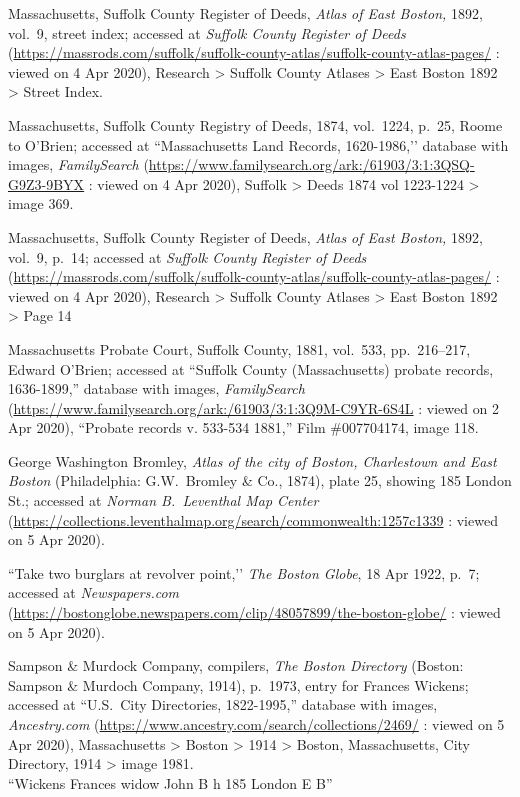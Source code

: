 \begin{thebibliography}{999}
Massachusetts, Suffolk County Register of Deeds, \textit{Atlas of East Boston,} 1892, vol.\ 9, street index; accessed at \textit{Suffolk County Register of Deeds} (\url{https://massrods.com/suffolk/suffolk-county-atlas/suffolk-county-atlas-pages/} : viewed on 4 Apr 2020), Research > Suffolk County Atlases > East Boston 1892 > Street Index.

Massachusetts, Suffolk County Registry of Deeds, 1874, vol.\ 1224, p.\ 25, Roome to O’Brien; accessed at ``Massachusetts Land Records, 1620-1986,’’ database with images, \textit{FamilySearch} (\url{https://www.familysearch.org/ark:/61903/3:1:3QSQ-G9Z3-9BYX} : viewed on 4 Apr 2020), Suffolk > Deeds 1874 vol 1223-1224 > image 369.

Massachusetts, Suffolk County Register of Deeds, \textit{Atlas of East Boston,} 1892, vol.\ 9, p.\ 14; accessed at \textit{Suffolk County Register of Deeds} (\url{https://massrods.com/suffolk/suffolk-county-atlas/suffolk-county-atlas-pages/} : viewed on 4 Apr 2020), Research > Suffolk County Atlases > East Boston 1892 > Page 14

Massachusetts Probate Court, Suffolk County, 1881, vol.\ 533, pp.\ 216--217, Edward O'Brien; accessed at ``Suffolk County (Massachusetts) probate records, 1636-1899,'' database with images, \textit{FamilySearch} (\url{https://www.familysearch.org/ark:/61903/3:1:3Q9M-C9YR-6S4L} : viewed on 2 Apr 2020), ``Probate records v. 533-534 1881,'' Film \#007704174, image 118.

George Washington Bromley, \textit{Atlas of the city of Boston, Charlestown and East Boston} (Philadelphia: G.W.\ Bromley \& Co., 1874), plate 25, showing 185 London St.; accessed at \textit{Norman B.\ Leventhal Map Center} (\url{https://collections.leventhalmap.org/search/commonwealth:1257c1339} : viewed on 5 Apr 2020).

``Take two burglars at revolver point,’’ \textit{The Boston Globe}, 18 Apr 1922, p.\ 7; accessed at \textit{Newspapers.com} (\url{https://bostonglobe.newspapers.com/clip/48057899/the-boston-globe/} : viewed on 5 Apr 2020).

Sampson \& Murdock Company, compilers, \textit{The Boston Directory} (Boston: Sampson \& Murdoch Company, 1914), p.\ 1973, entry for Frances Wickens; accessed at ``U.S.\ City Directories, 1822-1995,'' database with images, \textit{Ancestry.com} (\url{https://www.ancestry.com/search/collections/2469/} : viewed on 5 Apr 2020), Massachusetts > Boston > 1914 > Boston, Massachusetts, City Directory, 1914 > image 1981.\\
``Wickens Frances widow John B h 185 London E B''


\end{thebibliography}
